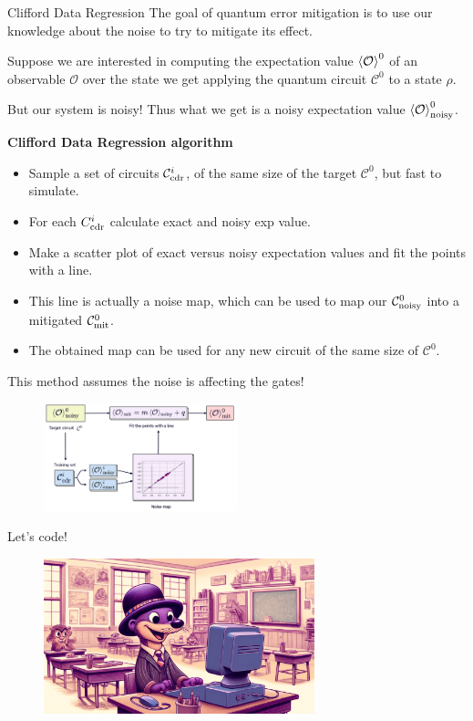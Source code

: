 \documentclass[aspectratio=169, 8pt, xcolor={svgnames}, hyperref={linkcolor=black}]{beamer}
\begin{document}
\begin{frame}{Clifford Data Regression}
\textcolor{carnelian}{The goal of quantum error mitigation is to use our knowledge about 
the noise to try to mitigate its effect.} \pause

Suppose we are interested in computing the expectation value $\braket{\mathcal{O}}^0$ 
of an observable $\mathcal{O}$
over the state we get applying the quantum circuit $\mathcal{C}^0$ to a state $\rho$. \pause

But our system is noisy! Thus what we get is a noisy expectation value $\braket{\mathcal{O}}^0_{\rm noisy}$. \pause

\begin{multicols}{2}
\textbf{Clifford Data Regression algorithm}
\begin{itemize}[noitemsep]
\item[1.] Sample a set of circuits $\mathcal{C}^i_{\rm cdr}$, of the 
same size of the target $\mathcal{C}^0$, but fast to simulate.
\item[2.] For each $C^i_{\rm cdr}$ calculate exact and noisy exp value.
\item[3.] Make a scatter plot of exact versus noisy expectation values and fit 
the points with a line.
\item[4.] This line is actually a noise map, which can be used to map our $\mathcal{C}^0_{\rm noisy}$
into a mitigated $\mathcal{C}^0_{\rm mit}$.
\item[5.] The obtained map can be used for any new circuit of the same size of $\mathcal{C}^0$.
\end{itemize}
\textcolor{carnelian}{This method assumes the noise is affecting the gates!}
\begin{figure}
    \includegraphics[width=0.5\textwidth]{figures/cdr.png}
\end{figure}
\end{multicols}

\end{frame}

\begin{frame}
\centering
\Huge Let's code!
\begin{figure}
   \includegraphics[width=0.7\textwidth]{figures/hands_on.png}
\end{figure}
\end{frame}
\end{document}
